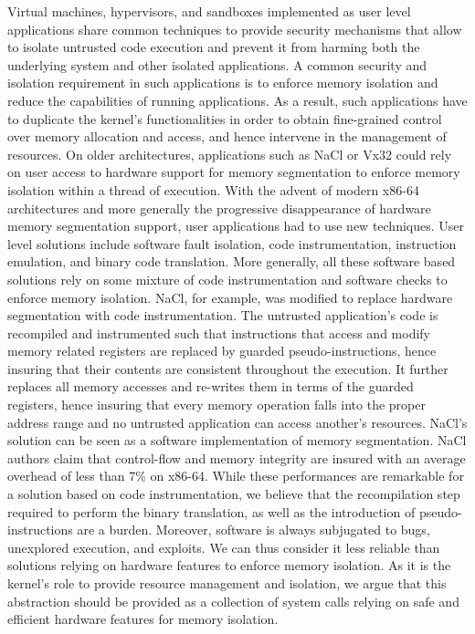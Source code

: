 \documentclass[letterpaper,twocolumn,10pt]{article}
\begin{document}
Virtual machines, hypervisors, and sandboxes implemented as user level applications share common techniques to provide security mechanisms that allow to isolate untrusted code execution and prevent it from harming both the underlying system and other isolated applications.
A common security and isolation requirement in such applications is to enforce memory isolation and reduce the capabilities of running applications.
As a result, such applications have to duplicate the kernel's functionalities in order to obtain fine-grained control over memory allocation and access, and hence intervene in the management of resources.
On older architectures, applications such as NaCl\cite{DBLP:journals/cacm/YeeSDCMOONF10,DBLP:conf/uss/SehrMBKPSYC10} or Vx32\cite{DBLP:conf/usenix/FordC08} could rely on user access to hardware support for memory segmentation to enforce memory isolation within a thread of execution.
With the advent of modern x86-64 architectures and more generally the progressive disappearance of hardware memory segmentation support, user applications had to use new techniques.
User level solutions include software fault isolation, code instrumentation, instruction emulation, and binary code translation.
More generally, all these software based solutions rely on some mixture of code instrumentation and software checks to enforce memory isolation.
NaCl\cite{DBLP:conf/uss/SehrMBKPSYC10}, for example, was modified to replace hardware segmentation with code instrumentation.
The untrusted application's code is recompiled and instrumented such that instructions that access and modify memory related registers are replaced by guarded pseudo-instructions, hence insuring that their contents are consistent throughout the execution.
It further replaces all memory accesses and re-writes them in terms of the guarded registers, hence insuring that every memory operation falls into the proper address range and no untrusted application can access another's resources.
NaCl's solution can be seen as a software implementation of memory segmentation.
NaCl authors claim that control-flow and memory integrity are insured with an average overhead of less than 7\% on x86-64.
While these performances are remarkable for a solution based on code instrumentation, we believe that the recompilation step required to perform the binary translation, as well as the introduction of pseudo-instructions are a burden.
Moreover, software is always subjugated to bugs, unexplored execution, and exploits.
We can thus consider it less reliable than solutions relying on hardware features to enforce memory isolation.
As it is the kernel's role to provide resource management and isolation, we argue that this abstraction should be provided as a collection of system calls relying on safe and efficient hardware features for memory isolation. \\
\end{document}
